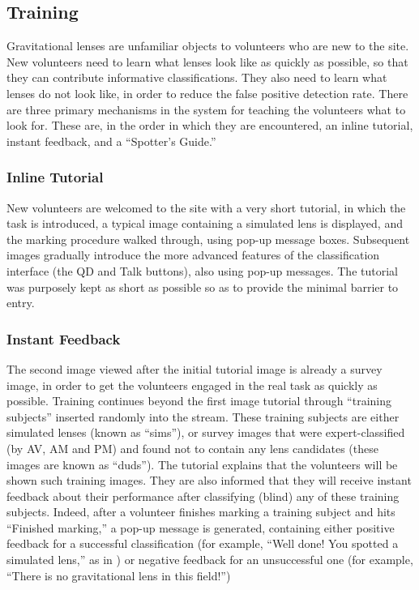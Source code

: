 \documentclass[useAMS,usenatbib,a4paper]{mn2e}
\begin{document}

\subsection{Training}
\label{sec:design:training}

Gravitational lenses are unfamiliar objects to volunteers who are new
to the site. New volunteers need to learn what lenses look like as quickly as
possible, so that they can contribute informative classifications. They also
need to learn what lenses do not look like, in order to reduce the false
positive detection rate. There are three primary mechanisms in the \sw system
for teaching the volunteers what to look for. These are, in the order in which
they are encountered, an inline tutorial, instant feedback,
and a ``Spotter's Guide.''

\subsubsection{Inline Tutorial}

New volunteers are welcomed to the site with a very short tutorial, in which
the task is introduced, a typical image containing a simulated lens is
displayed, and the marking procedure walked through, using pop-up message
boxes. Subsequent images gradually introduce the more advanced
features of the classification interface (the QD and Talk buttons), also using
pop-up messages. The tutorial was purposely kept as short as possible so as to
provide the minimal barrier to entry.

\subsubsection{Instant Feedback}

The second image viewed after the initial tutorial image is already a survey
image, in order to get the volunteers engaged in the real task as quickly as
possible. Training continues beyond the first image tutorial through
``training subjects'' inserted randomly into the stream.  These training
subjects are either simulated lenses (known as ``sims''), or survey images
that were expert-classified (by AV, AM and PM) and found not to contain any
lens candidates (these images are known as ``duds''). The tutorial explains
that the volunteers  will be shown such training images. They are also
informed that they will receive instant feedback about their performance after
classifying (blind) any of these training subjects. Indeed, after a volunteer
finishes marking a training subject and hits ``Finished marking,'' a pop-up
message is generated, containing either positive feedback for a successful
classification (for example, ``Well done! You spotted a simulated lens,'' as
in ) or negative feedback for an unsuccessful one (for
example, ``There is no gravitational lens in this field!'') 
\end{document}
